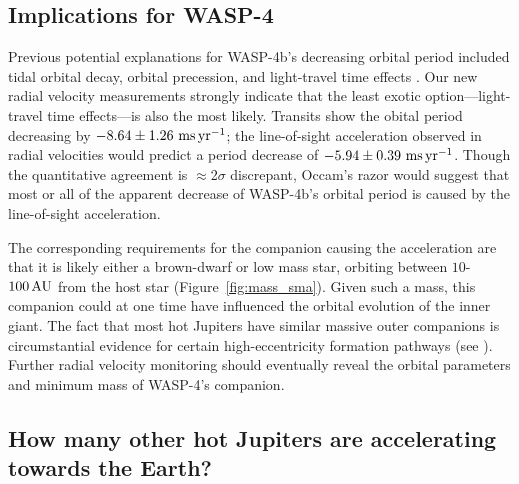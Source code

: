 \documentclass[12pt,twocolumn,tighten]{aastex62}
\begin{document}
\subsection{Implications for WASP-4}
Previous potential explanations for WASP-4b's decreasing orbital
period included tidal orbital decay, orbital precession, and
light-travel time effects \citep{bouma_wasp4b_2019}.  Our new radial
velocity measurements strongly indicate that the least exotic
option---light-travel time effects---is also the most likely.
Transits show the obital period decreasing by $- 8.64 \pm 1.26~{\rm
ms}\,{\rm yr}^{-1}$; the line-of-sight acceleration observed in radial
velocities would predict a period decrease of $-5.94 \pm 0.39~{\rm
ms}\,{\rm yr}^{-1}$.  Though the quantitative agreement is $\approx$2$\sigma$
discrepant, Occam's razor would suggest that most or all of the apparent
decrease of WASP-4b's orbital period is caused by the line-of-sight
acceleration.

The corresponding requirements for the companion causing the
acceleration are that it is likely either a brown-dwarf or low mass
star, orbiting between $10$-$100\,{\rm AU}$ from the host star
(Figure~\ref{fig:mass_sma}).  Given such a mass, this companion could
at one time have influenced the orbital evolution of the inner giant.
The fact that most hot Jupiters have similar massive outer companions
\citep{knutson_friends_2014,bryan_statistics_2016} is circumstantial
evidence for certain high-eccentricity formation pathways (see
\citealt{dawson_johnson_2018}).  Further radial velocity monitoring
should eventually reveal the orbital parameters and minimum mass of
WASP-4's companion.


\subsection{How many other hot Jupiters are accelerating towards the
Earth?}
\end{document}
